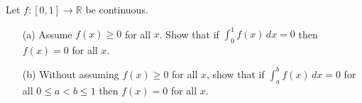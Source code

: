 \documentclass{exam}
\begin{document}
\begin{rating}
\end{rating}

\pagebreak

\begin{problem}
\end{problem}


\begin{mybox}
  
  Let $f : [0, 1] \rightarrow \mathbb{R}$ be continuous.
  \begin{enumerate}
    \item[(a)] Assume $f(x) \geq 0$ for all $x$. Show that if
    $\int_{0}^{1} f(x) \, dx = 0$ then $f(x) = 0$ for all $x$.
    \item[(b)] Without assuming $f(x) \geq 0$ for all $x$, show
    that if $\int_{a}^{b} f(x) \, dx = 0$ for all $0 \leq a < b \leq 1$
    then $f(x) = 0$ for all $x$.
  \end{enumerate}

\end{mybox}
\end{document}
